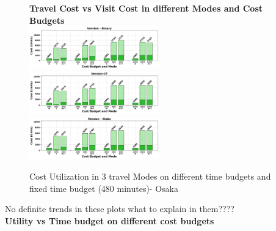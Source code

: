\begin{figure}[H]
\textbf{Travel Cost vs Visit Cost in different Modes and Cost Budgets}\\
\includegraphics[width=0.5\textwidth]{plots/CU4_pkj.png}
\includegraphics[width=0.5\textwidth]{plots/CU5_pkj.png}
\includegraphics[width=0.5\textwidth]{plots/CU6_pkj.png}
\hspace{8pt}
\caption{Cost Utilization in 3 travel Modes on different time budgets and fixed time budget (480 minutes)- Osaka}
\label{fig:CostUtilization2}
\end{figure}

No definite trends in these plots what to explain in them????\\


\noindent\textbf{Utility vs Time budget on different cost budgets}\\

